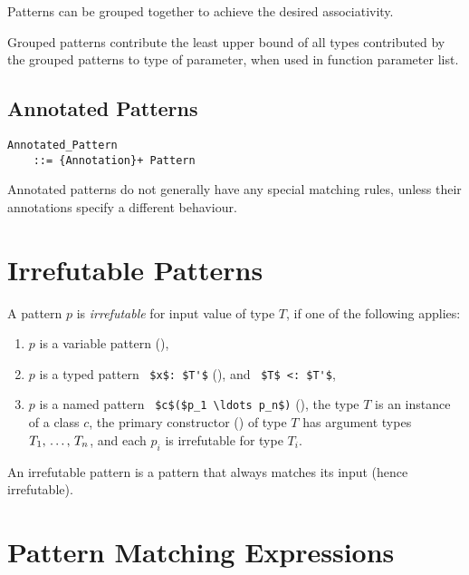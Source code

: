 Patterns can be grouped together to achieve the desired associativity. 

Grouped patterns contribute the least upper bound of all types contributed by the grouped patterns to type of parameter, when used in function parameter list. 





\subsection{Annotated Patterns}
\label{sec:annotated-patterns}

\grammar\begin{lstlisting}
Annotated_Pattern 
    ::= {Annotation}+ Pattern
\end{lstlisting}

Annotated patterns do not generally have any special matching rules, unless their annotations specify a different behaviour. 





\section{Irrefutable Patterns}
\label{sec:irrefutable-patterns}

A pattern $p$ is {\em irrefutable} for input value of type $T$, if one of the following applies: 
\begin{enumerate}
  \item $p$ is a variable pattern (),
  \item $p$ is a typed pattern ~\lstinline!$x$: $T'$! (), and ~\lstinline!$T$ <: $T'$!,
  \item $p$ is a named pattern ~\lstinline!$c$($p_1 \ldots p_n$)! (), the type $T$ is an instance of a class $c$, the primary constructor () of type $T$ has argument types $T_1 ,\, \ldots ,\, T_n$, and each $p_i$ is irrefutable for type $T_i$. 
\end{enumerate}

An irrefutable pattern is a pattern that always matches its input (hence irrefutable). 





\section{Pattern Matching Expressions}

